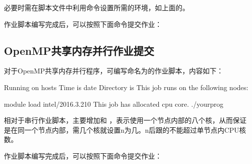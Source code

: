 \documentclass[a4paper,12pt,english]{sphinxmanual}
\begin{document}
\sphinxAtStartPar
必要时需在脚本文件中利用命令设置所需的环境，如上面的。

\sphinxAtStartPar
作业脚本编写完成后，可以按照下面命令提交作业：
\begin{quote}

\sphinxAtStartPar
{}
\end{quote}


\subsection{OpenMP共享内存并行作业提交}
\label{\detokenize{slurm/slurm:openmp}}
\sphinxAtStartPar
对于OpenMP共享内存并行程序，可编写命名为的作业脚本，内容如下：

\begin{sphinxVerbatim}[commandchars=\\\{\}]

 Running on hosts
 Time is date
 Directory is 
 This job runs on the following nodes:
 

module load intel/2016.3.210
 This job has allocated  cpu core.
 
./yourprog
\end{sphinxVerbatim}

\sphinxAtStartPar
相对于串行作业脚本，主要增加和 ，表示使用一个节点内部的八个核，从而保证是在同一个节点内部，需几个核就设置\sphinxhyphen{}n为几。\sphinxhyphen{}n后跟的不能超过单节点内CPU核数。

\sphinxAtStartPar
作业脚本编写完成后，可以按照下面命令提交作业：

\sphinxAtStartPar
{}
\end{document}
